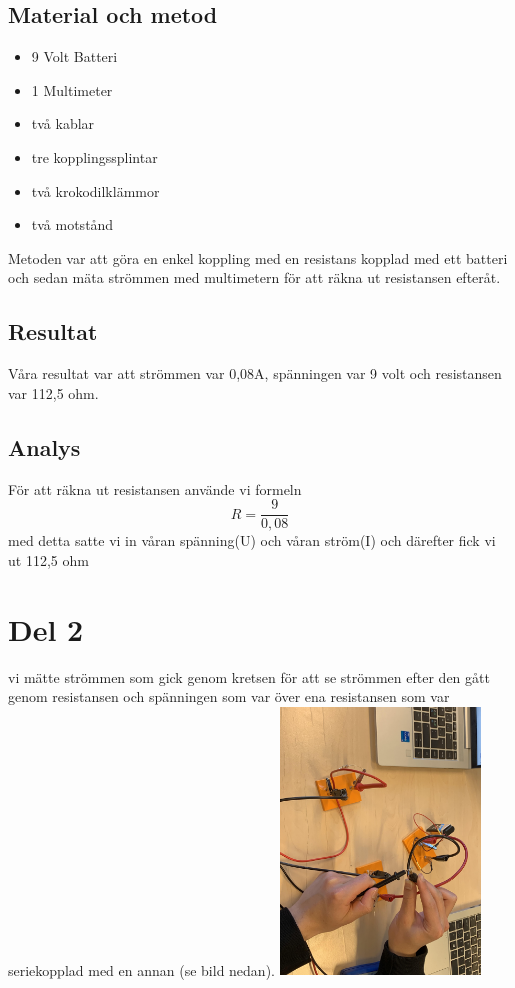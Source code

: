 \documentclass[11p]{article}
\begin{document}
    \subsection{Material och metod}
    \begin{itemize}
        \item 9 Volt Batteri
        \item 1 Multimeter
        \item två kablar
        \item tre kopplingssplintar
        \item två krokodilklämmor
        \item två motstånd
    \end{itemize}

    Metoden var att göra en enkel koppling med en resistans kopplad med ett batteri och sedan mäta strömmen med multimetern för att räkna ut resistansen efteråt.
    \subsection{Resultat}
    Våra resultat var att strömmen var 0,08A, spänningen var 9 volt och resistansen var 112,5 ohm.
    \subsection{Analys}
    För att räkna ut resistansen använde vi formeln \begin{equation} R = \frac{9}{0,08} \end{equation} med detta satte vi in våran spänning(U) och våran ström(I) och därefter fick vi ut 112,5 ohm
    \section{Del 2}
    vi mätte strömmen som gick genom kretsen för att se strömmen efter den gått genom resistansen och spänningen som var över ena resistansen som var seriekopplad med en annan (se bild nedan).
    \includegraphics[width=0.4\textwidth]{../images/BildDel2}
\end{document}
